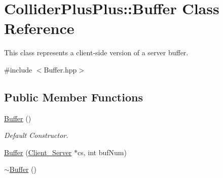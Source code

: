 \hypertarget{classColliderPlusPlus_1_1Buffer}{\section{Collider\-Plus\-Plus\-:\-:Buffer Class Reference}
\label{classColliderPlusPlus_1_1Buffer}
}


This class represents a client-\/side version of a server buffer.  




{\ttfamily \#include $<$Buffer.\-hpp$>$}

\subsection*{Public Member Functions}
\begin{DoxyCompactItemize}
\item 
\hypertarget{classColliderPlusPlus_1_1Buffer_aac5d271b57c8b6410b790794cfb790e1}{\hyperlink{classColliderPlusPlus_1_1Buffer_aac5d271b57c8b6410b790794cfb790e1}{Buffer} ()}\label{classColliderPlusPlus_1_1Buffer_aac5d271b57c8b6410b790794cfb790e1}

\begin{DoxyCompactList}\small\item\em Default Constructor. \end{DoxyCompactList}\item 
\hyperlink{classColliderPlusPlus_1_1Buffer_a253743cd16ea0a2579575dd9472a967d}{Buffer} (\hyperlink{classColliderPlusPlus_1_1Client__Server}{Client\-\_\-\-Server} $\ast$cs, int buf\-Num)
\item 
\hypertarget{classColliderPlusPlus_1_1Buffer_a62178f1cb35c5654c0b16d78526de7e8}{\hyperlink{classColliderPlusPlus_1_1Buffer_a62178f1cb35c5654c0b16d78526de7e8}{$\sim$\-Buffer} ()}\label{classColliderPlusPlus_1_1Buffer_a62178f1cb35c5654c0b16d78526de7e8}


\end{DoxyCompactItemize}

